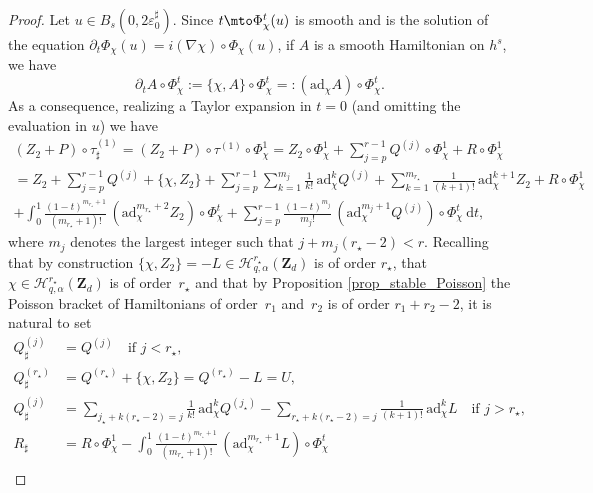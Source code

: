 \begin{proof}
Let $u\in B_s(0,2 \varepsilon_0^\sharp)$. Since $t\mto \Phi_\chi^t(u)$ is smooth and is the solution of the equation $\partial_t \Phi_\chi(u) = i (\nabla \chi)\circ \Phi_\chi(u)$, if $A$ is a smooth Hamiltonian on $h^s$, we have\vspace*{-3pt}
\[
\partial_t A \circ \Phi_\chi^t:= \{\chi, A \} \circ \Phi_\chi^t=: (\mathrm{ad}_{\chi} A) \circ \Phi_\chi^t.
\]
As a consequence, realizing a Taylor expansion in $t=0$ (and omitting the evaluation in $u$) we have\vspace*{-11pt}
\begin{multline*}
(Z_2+P)\circ \tau^{(1)}_\sharp = (Z_2+P)\circ \tau^{(1)} \circ \Phi_\chi^1
= Z_2 \circ \Phi_\chi^1 + \sum_{j=p}^{r-1} Q^{(j)} \circ \Phi_\chi^1 + R \circ \Phi_\chi^1 \\[-2pt]
= Z_2 + \sum_{j=p}^{r-1} Q^{(j)} + \{\chi,Z_2\} + \sum_{j=p}^{r-1} \sum_{k=1}^{m_{j}} \frac1{k !}\, \mathrm{ad}_{\chi}^k Q^{(j)} + \sum_{k=1}^{m_{r_\star}} \frac1{(k+1) !}\, \mathrm{ad}_{\chi}^{k+1} Z_2 + R \circ \Phi_\chi^1 \\[-2pt]
+ \int_0^1 \frac{(1-t)^{m_{r_\star} +1 }}{(m_{r_\star} +1) !}\, (\mathrm{ad}_{\chi}^{m_{r_\star} +2} Z_2)\circ \Phi_\chi^t + \sum_{j=p}^{r-1} \frac{(1-t)^{m_j}}{m_j !}\, (\mathrm{ad}_{\chi}^{m_j+1} Q^{(j)}) \circ \Phi_\chi^t \ \mathrm{d}t,
\end{multline*}
where $m_j$ denotes the largest integer such that $j+m_j (r_\star -2) < r$. Recalling that by construction $\{\chi,Z_2\} = -L \in \mathscr{H}_{q,\alpha}^{r_\star}(\mathbf{Z}_d)$ is of order $r_\star$, that $\chi \in \mathscr{H}_{q,\alpha}^{r_\star}(\mathbf{Z}_d)$ is of order~$r_\star$ and that by Proposition \ref{prop_stable_Poisson} the Poisson bracket of Hamiltonians of order~$r_1$ and~$r_2$ is of order $r_1+r_2-2$, it is natural to set\vspace*{-1pt}
\begin{align*}
Q^{(j)}_\sharp &= Q^{(j)} \quad \text{if } j < r_\star,\\[-2pt]
Q^{(r_\star)}_\sharp &= Q^{(r_\star)}+ \{\chi,Z_2\} = Q^{(r_\star)} - L =U,\\[-2pt]
Q^{(j)}_\sharp &= \sum_{ j_\star+k(r_\star - 2)= j} \frac1{k !}\, \mathrm{ad}_{\chi}^k Q^{(j_\star)} - \sum_{ r_\star+k(r_\star - 2)= j} \frac1{(k+1) !}\, \mathrm{ad}_{\chi}^k L \quad \text{if } j > r_\star,\\
R_\sharp&= R \circ \Phi_\chi^1
- \int_0^1 \frac{(1-t)^{m_{r_\star} +1 }}{(m_{r_\star} +1) !}\, (\mathrm{ad}_{\chi}^{m_{r_\star} +1} L)\circ \Phi_\chi^t\\[-5pt]

\end{align*}
\end{proof}
